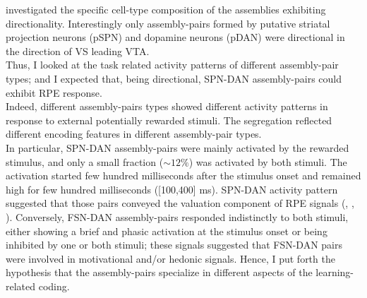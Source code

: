 investigated the specific cell-type composition of the assemblies exhibiting directionality. Interestingly only assembly-pairs formed by putative striatal projection neurons (pSPN) and dopamine neurons (pDAN) were directional in the direction of VS leading VTA.\\Thus, I looked at the task related activity patterns of different assembly-pair types; and I expected that, being directional, SPN-DAN assembly-pairs could exhibit RPE response.\\Indeed, different assembly-pairs types showed different activity patterns in response to external potentially rewarded stimuli. The segregation reflected different encoding features in different assembly-pair types.\\In particular, SPN-DAN assembly-pairs were mainly activated by the rewarded stimulus, and only a small fraction ($\sim12\%$) was activated by both stimuli. The activation started few hundred milliseconds after the stimulus onset and remained high for few hundred milliseconds ([100,400] ms). SPN-DAN activity pattern suggested that those pairs conveyed the valuation component of RPE signals (\cite{Tobler2003}, \cite{Nomoto2010}, \cite{Schultz2016}). Conversely, FSN-DAN assembly-pairs responded indistinctly to both stimuli, either showing a brief and phasic activation at the stimulus onset or being inhibited by one or both stimuli; these signals suggested that FSN-DAN pairs were involved in motivational and/or hedonic signals. Hence, I put forth the hypothesis that the assembly-pairs specialize in different aspects of the learning-related coding.\\%
